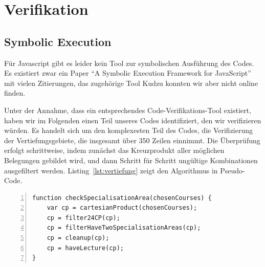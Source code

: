 \documentclass[ngerman]{article}
\begin{document}
\section{Verifikation}

\subsection{Symbolic Execution}
Für Javascript gibt es leider kein Tool zur symbolischen Ausführung des Codes.
Es existiert zwar ein Paper ``A Symbolic Execution Framework for JavaScript'' mit vielen Zitierungen, das zugehörige Tool Kudzu konnten wir aber nicht online finden.

Unter der Annahme, dass ein entsprechendes Code-Verifikations-Tool existiert, haben wir im Folgenden einen Teil unseres Codes identifiziert, den wir verifizieren würden.
Es handelt sich um den komplexesten Teil des Codes, die Verifizierung der Vertiefungsgebiete, die insgesamt über 350 Zeilen einnimmt.
Die Überprüfung erfolgt schrittweise, indem zunächst das Kreuzprodukt aller möglichen Belegungen gebildet wird, und dann Schritt für Schritt ungültige Kombinationen ausgefiltert werden.
Listing~\ref{lst:vertiefung} zeigt den Algorithmus in Pseudo-Code.

\begin{lstlisting}[caption=Pseudo-Code zur Prüfung von Vertiefungsgebieten,numbers=left,label={lst:vertiefung},frame=single]
function checkSpecialisationArea(chosenCourses) {
    var cp = cartesianProduct(chosenCourses);
    cp = filter24CP(cp);
    cp = filterHaveTwoSpecialisationAreas(cp);
    cp = cleanup(cp);
    cp = haveLecture(cp);
}
\end{lstlisting}
\end{document}

